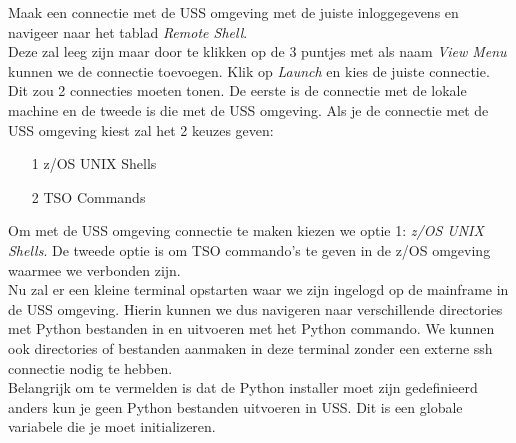 Maak een connectie met de USS omgeving met de juiste inloggegevens en navigeer naar het tablad \textit{Remote Shell}. \\

Deze zal leeg zijn maar door te klikken op de 3 puntjes met als naam \textit{View Menu} kunnen we de connectie toevoegen. Klik op \textit{Launch} en kies de juiste connectie. Dit zou 2 connecties moeten tonen. De eerste is de connectie met de lokale machine en de tweede is die met de USS omgeving. Als je de connectie met de USS omgeving kiest zal het 2 keuzes geven:

\begin{itemize}
    \item[1] z/OS UNIX Shells
    \item[2] TSO Commands
\end{itemize}

Om met de USS omgeving connectie te maken kiezen we optie 1: \textit{z/OS UNIX Shells}. De tweede optie is om TSO commando's te geven in de z/OS omgeving waarmee we verbonden zijn. \\

Nu zal er een kleine terminal opstarten waar we zijn ingelogd op de mainframe in de USS omgeving. Hierin kunnen we dus navigeren naar verschillende directories met Python bestanden in en uitvoeren met het Python commando. We kunnen ook directories of bestanden aanmaken in deze terminal zonder een externe ssh connectie nodig te hebben. \\

Belangrijk om te vermelden is dat de Python installer moet zijn gedefinieerd anders kun je geen Python bestanden uitvoeren in USS. Dit is een globale variabele die je moet initializeren.